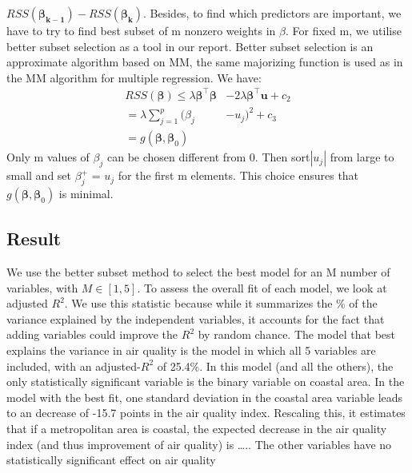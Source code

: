 \documentclass[
]{article}
\begin{document}
\(RSS (\boldsymbol{\beta_{k-1}})-RSS (\boldsymbol{\beta_{k}})\).
Besides, to find which predictors are important, we have to try to find
best subset of m nonzero weights in \(\beta\). For fixed m, we utilise
better subset selection as a tool in our report. Better subset selection
is an approximate algorithm based on MM, the same majorizing function is
used as in the MM algorithm for multiple regression. We have: \[
\begin{align}
RSS (\boldsymbol\beta)\leq\lambda\boldsymbol\beta^\top\boldsymbol\beta&-2\lambda\boldsymbol\beta^\top\boldsymbol{u}+c_2
\\
=\lambda\sum_{j=1}^p (\beta_{j}&-u_{j})^2 + c_{3} 
\\
= g(\boldsymbol\beta,\boldsymbol\beta_{0})
\end{align}
\] Only m values of \(\beta_{j}\) can be chosen different from 0. Then
sort\(|u_{j}|\) from large to small and set \(\beta_{j}^+\) = \(u_{j}\)
for the first m elements. This choice ensures that
\(g(\boldsymbol\beta,\boldsymbol\beta_{0})\) is minimal.

\hypertarget{Result}{%
\subsection{Result}\label{Result}}

We use the better subset method to select the best model for an M number
of variables, with \(M \in [1,5]\). To assess the overall fit of each
model, we look at adjusted \(R^2\). We use this statistic because while
it summarizes the \% of the variance explained by the independent
variables, it accounts for the fact that adding variables could improve
the \(R^2\) by random chance. The model that best explains the variance
in air quality is the model in which all 5 variables are included, with
an adjusted-\(R^2\) of 25.4\%. In this model (and all the others), the
only statistically significant variable is the binary variable on
coastal area. In the model with the best fit, one standard deviation in
the coastal area variable leads to an decrease of -15.7 points in the
air quality index. Rescaling this, it estimates that if a metropolitan
area is coastal, the expected decrease in the air quality index (and
thus improvement of air quality) is \ldots.. The other variables have no
statistically significant effect on air quality
\end{document}

